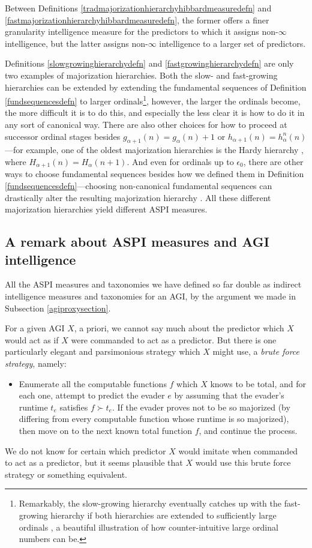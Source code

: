 \documentclass[twoside,11pt]{article}
\begin{document}
Between Definitions \ref{tradmajorizationhierarchyhibbardmeasuredefn} and
\ref{fastmajorizationhierarchyhibbardmeasuredefn}, the former offers a finer
granularity
intelligence measure for the predictors to which it assigns non-$\infty$
intelligence, but the latter assigns non-$\infty$ intelligence to a larger
set of predictors.

Definitions \ref{slowgrowinghierarchydefn}
and \ref{fastgrowinghierarchydefn} are only two
examples of
majorization hierarchies. Both the slow- and fast-growing hierarchies can be
extended by extending the fundamental sequences of Definition
\ref{fundsequencesdefn} to larger ordinals\footnote{Remarkably,
the slow-growing hierarchy eventually catches up with the fast-growing hierarchy
if both hierarchies are extended to sufficiently large ordinals
\citep{wainer1989slow, girard1981pi12}, a beautiful illustration of
how counter-intuitive
large ordinal numbers can be.}, however, the larger
the ordinals become, the more difficult it is to do this, and especially the less
clear it is how to do it in any sort of canonical way.
There are also other choices for how to proceed at successor ordinal stages besides
$g_{\alpha+1}(n)=g_\alpha(n)+1$ or $h_{\alpha+1}(n)=h^n_\alpha(n)$---for example,
one of the oldest majorization hierarchies is the Hardy hierarchy
\citep{hardy1904theorem}, where $H_{\alpha+1}(n)=H_\alpha(n+1)$.
And even for ordinals up to $\epsilon_0$,
there are other ways to choose fundamental sequences besides how we defined them in
Definition \ref{fundsequencesdefn}---choosing non-canonical fundamental sequences can
drastically alter the resulting majorization hierarchy \citep{weiermann1997sometimes}.
All these different majorization hierarchies yield different ASPI measures.

\subsection{A remark about ASPI measures and AGI intelligence}

All the ASPI measures and taxonomies we have defined so far double as indirect
intelligence measures and taxonomies for an AGI, by the argument we made
in Subsection \ref{agiproxysection}.

For a given AGI $X$, a priori, we cannot say much about the predictor which $X$
would act as if $X$ were commanded to act as a predictor. But there is one particularly
elegant and parsimonious strategy which $X$ might use, a \emph{brute force strategy},
namely:
\begin{itemize}
    \item Enumerate all the
    computable functions $f$ which $X$ knows to be total, and for each one, attempt to
    predict the evader $e$ by assuming that the evader's runtime $t_e$
    satisfies $f\succ t_e$.
    If the evader proves not to be so majorized (by differing from every computable
    function whose runtime is so majorized), then move on to the next
    known total function $f$, and continue the process.
\end{itemize}
We do not
know for certain which predictor $X$ would imitate when commanded to act as a predictor,
but it seems plausible that $X$ would use this brute force strategy or something
equivalent.
\end{document}
